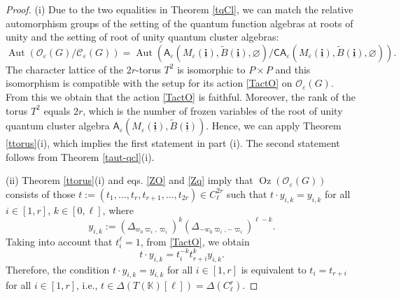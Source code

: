 \documentclass[11pt]{amsart}
\theoremstyle{plain}
\newcommand \thref[1]{Theorem \ref{t#1}}
\def \KK {{\mathbb C}}
\def \KK {{\mathbb K}}
\def \cC {\mathcal{C}}
\def \A {{\boldsymbol{\mathsf A}}}
\def \C {{\boldsymbol{\mathsf C}}}
\def \B  {{\widetilde{B}}}
\def \OO {{\mathcal{O}}}
\def \ep {\varepsilon}
\newcommand{\ubi}{\underline{\mathbf{i}}}
\DeclareMathOperator \Aut { {\mathrm{Aut}} }
\DeclareMathOperator \Oz { {\mathrm{Oz}}}
\begin{document}
\begin{proof} (i) Due to the two equalities in \thref{qCl}, we can match the relative automorphism 
groups of the setting of the quantum function algebras at roots of unity and the setting of root of unity quantum cluster algebras:
\[
\Aut(\OO_\ep(G)/ \cC_\ep(G)) = 
\Aut ( \A_\ep(M_\ep(\ubi), \B(\ubi), \varnothing) /  \C \A_\ep(M_\ep(\ubi), \B(\ubi), \varnothing)).
\]
The character lattice of the $2r$-torus $T^2$ is isomorphic to $P \times P$ and this isomorphism is compatible with the setup for its action \eqref{TactO} on $\OO_\ep(G)$. 
From this we obtain that the action \eqref{TactO} is faithful. Moreover, the rank of the torus $T^2$ equals $2r$, which is the number of frozen variables of the 
root of unity quantum cluster algebra $\A_\ep(M_\ep(\ubi), \B(\ubi))$. Hence, we can apply \thref{torus}(i), which implies the first statement in part (i). 
The second statement follows from \thref{aut-qcl}(i).  

(ii) \thref{torus}(i) and eqs. \eqref{ZO} and \eqref{Zq} imply that $\Oz(\OO_\ep(G))$ consists of those $t:=(t_1, \ldots, t_r, t_{r+1}, \ldots, t_{2r}) \in C_\ell^{2r}$ such that
$t \cdot y_{i,k} = y_{i,k}$ for all $i \in [1,r]$, $k \in [0, \ell]$, where 
\[
y_{i,k} := 
 \left(\Delta_{w_0\varpi_i,\varpi_i}\right)^k \left(\Delta_{-w_0\varpi_i,-\varpi_i}\right)^{\ell-k}.
\]
Taking into account that $t_i^\ell = 1$, from \eqref{TactO}, we obtain 
\[
t \cdot y_{i,k} = t_i^{-k} t_{r+i}^k  y_{i,k}.
\]
Therefore, the condition $t \cdot y_{i,k} = y_{i,k}$ for all $i \in [1,r]$ is equivalent to $t_i = t_{r+i}$ for all $i \in [1,r]$, i.e., 
$t \in \Delta(T(\KK)[\ell]) = \Delta(C_\ell^r)$. 


\end{proof}
\end{document}
